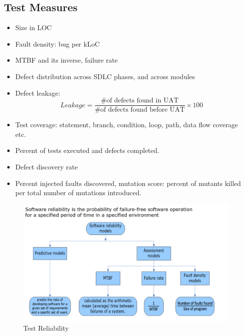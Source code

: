 \documentclass{article}
\begin{document}
\subsection{Test Measures}
\begin{itemize}
    \item Size in LOC
    
    \item Fault density: bug per kLoC
    
    \item MTBF and its inverse, failure rate
    
    \item Defect distribution across SDLC phases, and across modules
    
    \item Defect leakage:
    \begin{equation*}
        Leakage = \frac{\text{\# of defects found in UAT}}{\text{\# of defects found before UAT}} \times 100
    \end{equation*}
    
    \item Test coverage: statement, branch, condition, loop, path, data flow coverage etc.
    
    \item Percent of tests executed and defects completed. 
    
    \item Defect discovery rate
    
    \item Percent injected faults discovered, mutation score: percent of mutants killed per total number of mutations introduced.
\end{itemize}
\begin{figure}[!h]
    \centering
    \includegraphics[scale=0.5]{p1.png}
    \caption{Test Reliability}
    \label{fig:my_label}
\end{figure}
\end{document}
